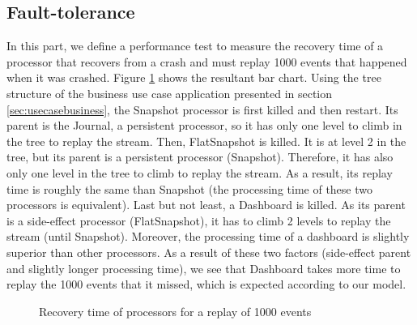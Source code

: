 \subsection{Fault-tolerance}

In this part, we define a performance test to measure the recovery time of a processor that recovers from a crash and must replay 1000 events that happened when it was crashed. Figure \ref{fig:barchart} shows the resultant bar chart.
Using the tree structure of the business use case application presented in section \ref{sec:usecasebusiness}, the Snapshot processor is first killed and then restart. Its parent is the Journal, a persistent processor, so it has only one level to climb in the tree to replay the stream. Then, FlatSnapshot is killed. It is at level 2 in the tree, but its parent is a persistent processor (Snapshot). Therefore, it has also only one level in the tree to climb to replay the stream. As a result, its replay time is roughly the same than Snapshot (the processing time of these two processors is equivalent). Last but not least, a Dashboard is killed. As its parent is a side-effect processor (FlatSnapshot), it has to climb 2 levels to replay the stream (until Snapshot). Moreover, the processing time of a dashboard is slightly superior than other processors. As a result of these two factors (side-effect parent and slightly longer processing time), we see that Dashboard takes more time to replay the 1000 events that it missed, which is expected according to our model.

\begin{figure}[h]
  \begin{center} 
    \caption{Recovery time of processors for a replay of 1000 events}
    \label{fig:barchart}
  \end{center}
\end{figure}


